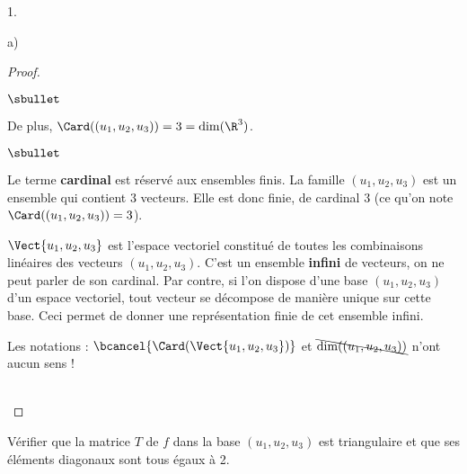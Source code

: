 \documentclass[11pt]{article}%
\begin{document}
\begin{noliste}{1.}
\begin{noliste}{a)}
\begin{proof}
\begin{noliste}{$\sbullet$}
      \item De plus, $\Card((u_1, u_2, u_3)) = 3 = \dim(\R^3)$. %
        ~\\[-1.2cm]
      \end{noliste}
      \begin{remark}%
        \begin{noliste}{$\sbullet$}
        \item Le terme {\bf cardinal} est réservé aux ensembles
          finis. La famille $(u_1, u_2, u_3)$ est un ensemble qui
          contient $3$ vecteurs. Elle est donc finie, de cardinal $3$
          (ce qu'on note $\Card((u_1, u_2, u_3)) = 3$).

        \item $\Vect{u_1, u_2, u_3}$ est l'espace vectoriel constitué
          de toutes les combinaisons linéaires des vecteurs $(u_1,
          u_2, u_3)$. C'est un ensemble {\bf infini} de vecteurs, on
          ne peut parler de son cardinal. Par contre, si l'on dispose
          d'une base $(u_1, u_2, u_3)$ d'un espace vectoriel, tout
          vecteur se décompose de manière unique sur cette base. Ceci
          permet de donner une représentation finie de cet ensemble
          infini.

        \item Les notations : $\bcancel{\Card(\Vect{u_1, u_2, u_3})}$
          et $\bcancel{\dim((u_1, u_2, u_3))}$ n'ont aucun sens !
        \end{noliste}
      \end{remark}~\\[-1.4cm]
    \end{proof}		


    \newpage


  \item Vérifier que la matrice $T$ de $f$ dans la base
    $(u_{1},u_{2},u_{3})$ est triangulaire et que ses éléments
    diagonaux sont tous égaux à 2.


\end{noliste}
\end{noliste}
\end{document}
